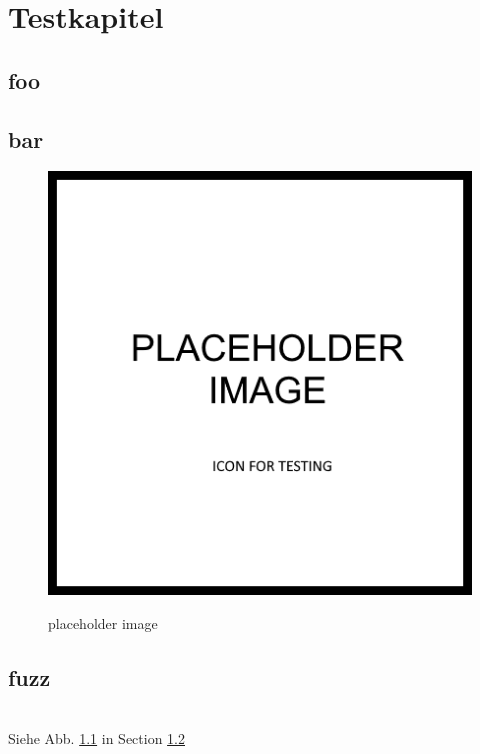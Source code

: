 \chapter{Testkapitel}
\section{foo}
\blindmathpaper
\section{bar}
\label{section_bar}
\blindmathpaper
\begin{figure}[H]
    \centering
    \includegraphics[width=.25\paperwidth, height=.5\paperwidth, keepaspectratio]{./graphics/empty.png}
    \label{figEmpty}
    \caption{placeholder image}
\end{figure}

\section{fuzz}
\blindmathpaper
\\

Siehe Abb. \ref{figEmpty}
in Section \ref{section_bar}
\\

\blindmathpaper
